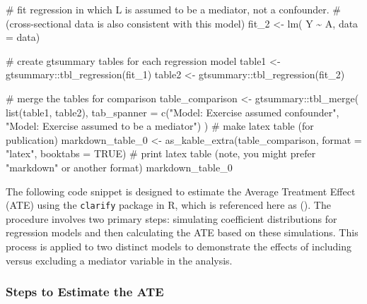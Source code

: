 \documentclass[
  singlecolumn]{article}
\newenvironment{Shaded}{}{}
\newcommand{\AttributeTok}[1]{\textcolor[rgb]{0.84,0.23,0.29}{#1}}
\newcommand{\CommentTok}[1]{\textcolor[rgb]{0.42,0.45,0.49}{#1}}
\newcommand{\ConstantTok}[1]{\textcolor[rgb]{0.00,0.36,0.77}{#1}}
\newcommand{\FunctionTok}[1]{\textcolor[rgb]{0.44,0.26,0.76}{#1}}
\newcommand{\NormalTok}[1]{\textcolor[rgb]{0.14,0.16,0.18}{#1}}
\newcommand{\OtherTok}[1]{\textcolor[rgb]{0.44,0.26,0.76}{#1}}
\newcommand{\SpecialCharTok}[1]{\textcolor[rgb]{0.00,0.36,0.77}{#1}}
\newcommand{\StringTok}[1]{\textcolor[rgb]{0.01,0.18,0.38}{#1}}
\begin{document}
\begin{Shaded}
\begin{Highlighting}[]
\CommentTok{\# fit regression in which L is assumed to be a mediator, not a confounder.}
\CommentTok{\# (cross{-}sectional data is also consistent with this model)}
\NormalTok{fit\_2 }\OtherTok{\textless{}{-}} \FunctionTok{lm}\NormalTok{( Y }\SpecialCharTok{\textasciitilde{}}\NormalTok{ A, }\AttributeTok{data =}\NormalTok{ data)}

\CommentTok{\# create gtsummary tables for each regression model}
\NormalTok{table1 }\OtherTok{\textless{}{-}}\NormalTok{ gtsummary}\SpecialCharTok{::}\FunctionTok{tbl\_regression}\NormalTok{(fit\_1)}
\NormalTok{table2 }\OtherTok{\textless{}{-}}\NormalTok{ gtsummary}\SpecialCharTok{::}\FunctionTok{tbl\_regression}\NormalTok{(fit\_2)}

\CommentTok{\# merge the tables for comparison}
\NormalTok{table\_comparison }\OtherTok{\textless{}{-}}\NormalTok{ gtsummary}\SpecialCharTok{::}\FunctionTok{tbl\_merge}\NormalTok{(}
  \FunctionTok{list}\NormalTok{(table1, table2),}
  \AttributeTok{tab\_spanner =} \FunctionTok{c}\NormalTok{(}\StringTok{"Model: Exercise assumed confounder"}\NormalTok{, }
                  \StringTok{"Model: Exercise assumed to be a mediator"}\NormalTok{)}
\NormalTok{)}
\CommentTok{\# make latex table (for publication)}
\NormalTok{markdown\_table\_0 }\OtherTok{\textless{}{-}} \FunctionTok{as\_kable\_extra}\NormalTok{(table\_comparison, }
                                   \AttributeTok{format =} \StringTok{"latex"}\NormalTok{, }
                                   \AttributeTok{booktabs =} \ConstantTok{TRUE}\NormalTok{)}
\CommentTok{\# print latex table (note, you might prefer "markdown" or another format)                                }
\NormalTok{markdown\_table\_0}
\end{Highlighting}
\end{Shaded}

The following code snippet is designed to estimate the Average Treatment
Effect (ATE) using the \texttt{clarify} package in R, which is
referenced here as (). The procedure involves two primary steps: simulating coefficient
distributions for regression models and then calculating the ATE based
on these simulations. This process is applied to two distinct models to
demonstrate the effects of including versus excluding a mediator
variable in the analysis.

\subsubsection{Steps to Estimate the
ATE}\label{steps-to-estimate-the-ate}
\end{document}
